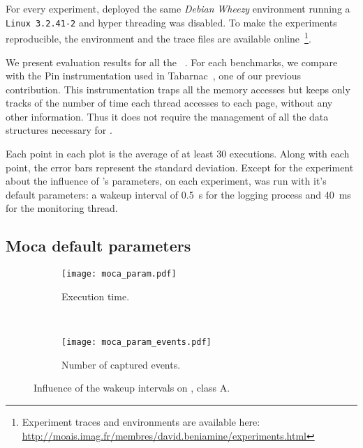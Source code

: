 For every experiment, deployed the same \emph{Debian} \emph{Wheezy}
environment running a \texttt{Linux 3.2.41-2} and hyper threading was
disabled.
To make the experiments reproducible, the environment and the trace files are
available
online~\footnote{Experiment traces and environments are available here:\\ \url{http://moais.imag.fr/membres/david.beniamine/experiments.html}}.

We present evaluation results for all the \NPB~\cite{Jin1999}. For
each benchmarks, we compare \Moca with the Pin instrumentation
used in Tabarnac~\cite{Beniamine15TABARNACRR}, one of our previous contribution. This instrumentation traps all the
memory accesses but keeps only tracks of the number of time each thread accesses to
each page, without any other information. Thus it does not require the management
of all the data structures necessary for \Moca.

Each point in each plot is the average of at least $30$ executions. Along with each point,
the error bars represent the standard deviation.
Except for the experiment about the influence of \Moca's parameters, on each
experiment, \Moca was run with it's default parameters: a wakeup interval of
\SI{0.5}{s} for the logging process and \SI{40}{ms} for the monitoring thread.

\subsection{Moca default parameters}
\label{sec:expe-param}

\begin{figure*}[htb]
    \centering
    \begin{subfigure}{.49\linewidth}
        \texttt{[image: moca\_param.pdf]}
        \caption{Execution time.}
        \label{fig:param_time}
    \end{subfigure}
    ~
    \begin{subfigure}{.49\linewidth}
        \texttt{[image: moca\_param\_events.pdf]}
        \caption{Number of captured events.}
        \label{fig:param_evts}
    \end{subfigure}
    \caption{Influence of the wakeup intervals on \IS, class A.}
    \label{fig:param}
\end{figure*}




